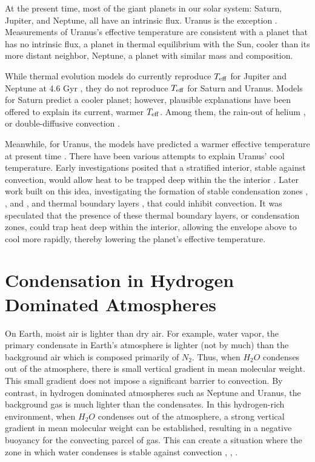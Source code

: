 \documentclass[11pt]{ucscthesisbs}
\begin{document}
At the present time, most of the giant planets in our solar system: Saturn, Jupiter, and Neptune, all have an intrinsic flux. Uranus is the exception \citep{pearl_conrath_1991}. Measurements of Uranus's effective temperature are consistent with a planet that has no intrinsic flux, a planet in thermal equilibrium with the Sun, cooler than its more distant neighbor, Neptune, a planet with similar mass and composition. 

While thermal evolution models do currently reproduce $T_{\rm eff}$ for Jupiter and Neptune at 4.6 Gyr \citep{graboske_1975,fortney_2011}, they do not reproduce $T_{\rm eff}$ for Saturn and Uranus. Models for Saturn predict a cooler planet; however, plausible explanations have been offered to explain its current, warmer $T_{\rm eff}$. Among them, the rain-out of helium \citep{fortney_hubbard_2003, mankovich_2020}, or double-diffusive convection \citep{leconte_chabrier_2013}. 

Meanwhile, for Uranus, the models have predicted a warmer effective temperature at present time \citep{fortney_2011, podolak_1991, hubbard_1995, scheibe_2019}. There have been various attempts to explain Uranus' cool temperature. Early investigations posited that a stratified interior, stable against convection, would allow heat to be trapped deep within the the interior \citep{podolak_1991}. Later work built on this idea, investigating the formation of stable condensation zones \citep{friedson_2017}, \citep{leconte_2017}, and \citep{guillot_1995}, and thermal boundary layers \citep{nettelmann_2016}, that could inhibit convection. It was speculated that the presence of these thermal boundary layers, or condensation zones, could trap heat deep within the interior, allowing the envelope above to cool more rapidly, thereby lowering the planet's effective temperature.

\section{Condensation in Hydrogen Dominated Atmospheres}
On Earth, moist air is lighter than dry air. For example, water vapor, the primary condensate in Earth's atmosphere is lighter (not by much) than the background air which is composed primarily of $N_{2}$. Thus, when $H_{2}O$ condenses out of the atmosphere, there is small vertical gradient in mean molecular weight. This small gradient does not impose a significant barrier to convection. By contrast, in hydrogen dominated atmospheres such as Neptune and Uranus, the background gas is much lighter than the condensates. In this hydrogen-rich environment, when $H_{2}O$ condenses out of the atmosphere, a strong vertical gradient in mean molecular weight can be established, resulting in a negative buoyancy for the convecting parcel of gas. This can create a situation where the zone in which water condenses is stable against convection \citep{guillot_1995}, \citep{friedson_2017}, \citep{leconte_2017}. 
\end{document}
